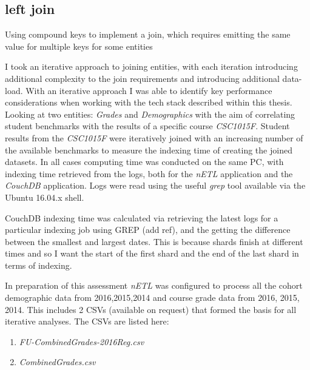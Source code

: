 \subsection{left join}
Using compound keys to implement a join, which requires emitting the same value for multiple keys for some entities























I took an iterative approach to joining entities, with each iteration introducing additional complexity to the join requirements and introducing additional data-load. With an iterative approach I was able to identify key performance considerations when working with the tech stack described within this thesis. Looking at two entities: \textit{Grades} and \textit{Demographics} with the aim of correlating student benchmarks with the results of a specific course \textit{CSC1015F}. Student results from the \textit{CSC1015F} were iteratively joined with an increasing number of the available benchmarks to measure the indexing time of creating the joined datasets. In all cases computing time was conducted on the same PC, with indexing time retrieved from the logs, both for the \textit{nETL} application and the \textit{CouchDB} application. Logs were read using the useful \textit{grep} tool available via the Ubuntu 16.04.x shell.

CouchDB indexing time was calculated via retrieving the latest logs for a particular indexing job using GREP (add ref), and the getting the difference between the smallest and largest dates. This is because shards finish at different times and so I want the start of the first shard and the end of the last shard in terms of indexing.

In preparation of this assessment \textit{nETL} was configured to process all the cohort demographic data from 2016,2015,2014 and course grade data from 2016, 2015, 2014. This includes 2 CSVs (available on request) that formed the basis for all iterative analyses. The CSVs are listed here:

\begin{enumerate}
    \item \textit{FU-CombinedGrades-2016Reg.csv}
    \item \textit{CombinedGrades.csv}
\end{enumerate}



